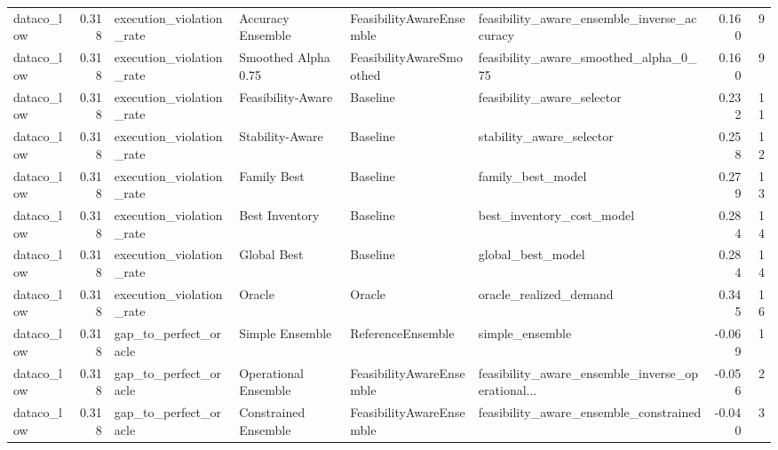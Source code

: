 \begin{table}
{\begin{tabular}{lrllllrr}
    dataco\_low &             0.318 &    execution\_violation\_rate &     Accuracy Ensemble &  FeasibilityAwareEnsemble &        feasibility\_aware\_ensemble\_inverse\_accuracy &         0.160 &               9 \\
    dataco\_low &             0.318 &    execution\_violation\_rate &   Smoothed Alpha 0.75 &  FeasibilityAwareSmoothed &              feasibility\_aware\_smoothed\_alpha\_0\_75 &         0.160 &               9 \\
    dataco\_low &             0.318 &    execution\_violation\_rate &     Feasibility-Aware &                  Baseline &                         feasibility\_aware\_selector &         0.232 &              11 \\
    dataco\_low &             0.318 &    execution\_violation\_rate &       Stability-Aware &                  Baseline &                           stability\_aware\_selector &         0.258 &              12 \\
    dataco\_low &             0.318 &    execution\_violation\_rate &           Family Best &                  Baseline &                                  family\_best\_model &         0.279 &              13 \\
    dataco\_low &             0.318 &    execution\_violation\_rate &        Best Inventory &                  Baseline &                          best\_inventory\_cost\_model &         0.284 &              14 \\
    dataco\_low &             0.318 &    execution\_violation\_rate &           Global Best &                  Baseline &                                  global\_best\_model &         0.284 &              14 \\
    dataco\_low &             0.318 &    execution\_violation\_rate &                Oracle &                    Oracle &                             oracle\_realized\_demand &         0.345 &              16 \\
    dataco\_low &             0.318 &       gap\_to\_perfect\_oracle &       Simple Ensemble &         ReferenceEnsemble &                                    simple\_ensemble &        -0.069 &               1 \\
    dataco\_low &             0.318 &       gap\_to\_perfect\_oracle &  Operational Ensemble &  FeasibilityAwareEnsemble &  feasibility\_aware\_ensemble\_inverse\_operational... &        -0.056 &               2 \\
    dataco\_low &             0.318 &       gap\_to\_perfect\_oracle &  Constrained Ensemble &  FeasibilityAwareEnsemble &             feasibility\_aware\_ensemble\_constrained &        -0.040 &               3 \\

\end{tabular}}
\end{table}
